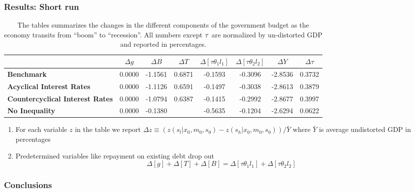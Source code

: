 \documentclass{beamer}
\begin{document}
 \begin{frame}
 \frametitle{Results: Short run}
 {\tiny
\begin{table}[tbp]
\begin{tabular}{|l|c|c|c|c|c|c|c|}
\hline
& \textbf{$\Delta g$} & \textbf{$\Delta B$} & \textbf{$\Delta T$} & \textbf{$%
\Delta [\tau\theta_1l_1]$} & \textbf{$\Delta [\tau\theta_2l_2]$} & \textbf{$%
\Delta Y$} & \textbf{$\Delta \tau$} \\ \hline
\textbf{Benchmark} & 0.0000 & -1.1561 & 0.6871 & -0.1593 & -0.3096 & -2.8536
& 0.3732 \\ \hline
\textbf{Acyclical Interest Rates} & 0.0000 & -1.1126 & 0.6591 & -0.1497 &
-0.3038 & -2.8613 & 0.3879 \\ \hline
\textbf{Countercyclical Interest Rates} & 0.0000 & -1.0794 & 0.6387 & -0.1415 &
-0.2992 & -2.8677 & 0.3997 \\ \hline
\textbf{No Inequality} & 0.0000 & -0.1380 &\color{red}{\textbf{ -0.5459}} & -0.5635 & -0.1204 &
-2.6294 & 0.0622 \\ \hline

\end{tabular}%

\caption{The tables summarizes the changes in the different components of the government budget as the economy transits from ``boom'' to  ``recession''.  All numbers except $\protect\tau $ are normalized by un-distorted GDP  and reported in percentages.
}

\label{tab:ShortRunPolicyResponses}
\end{table}
}
\begin{enumerate}
 \item For each variable
$z$ in the table we report  $\Delta z\equiv \left( z\left(
s_l|x_0,m_0,s_0\right) -z\left( s_h|x_0,m_0,s_0\right) \right) /\bar{Y}
$ where $\bar{Y}$ is average undistorted GDP in percentages
\item Predetermined variables like repayment on existing debt drop out
\begin{equation*}
\Delta [g]+\Delta[T]+ \Delta [B]=\Delta[\tau \theta_1 l_1]+ \Delta[\tau
\theta_2 l_2]
\end{equation*}%

\end{enumerate}

\small

 \end{frame}

\begin{frame}
 \frametitle{Conclusions}
\end{frame}
\end{document}
